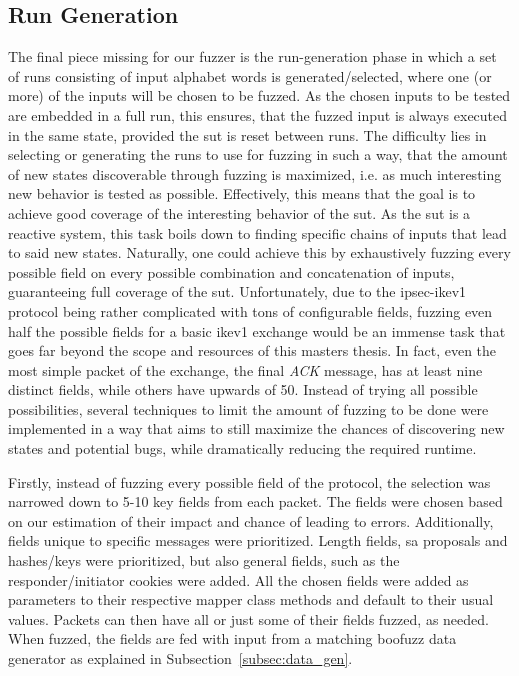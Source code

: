 \subsection{Run Generation} \label{subsec:run_generation}
The final piece missing for our fuzzer is the run-generation phase in which a set of runs consisting of input alphabet words is generated/selected, where one (or more) of the inputs will be chosen to be fuzzed. As the chosen inputs to be tested are embedded in a full run, this ensures, that the fuzzed input is always executed in the same state, provided the \ac{sut} is reset between runs. The difficulty lies in selecting or generating the runs to use for fuzzing in such a way, that the amount of new states discoverable through fuzzing is maximized, i.e. as much interesting new behavior is tested as possible. Effectively, this means that the goal is to achieve good coverage of the interesting behavior of the \ac{sut}. As the \ac{sut} is a reactive system, this task boils down to finding specific chains of inputs that lead to said new states. Naturally, one could achieve this by exhaustively fuzzing every possible field on every possible combination and concatenation of inputs, guaranteeing full coverage of the \ac{sut}. Unfortunately, due to the \ac{ipsec}-\ac{ike}v1 protocol being rather complicated with tons of configurable fields, fuzzing even half the possible fields for a basic \ac{ike}v1 exchange would be an immense task that goes far beyond the scope and resources of this masters thesis. In fact, even the most simple packet of the exchange, the final \emph{ACK} message, has at least nine distinct fields, while others have upwards of 50. Instead of trying all possible possibilities, several techniques to limit the amount of fuzzing to be done were implemented in a way that aims to still maximize the chances of discovering new states and potential bugs, while dramatically reducing the required runtime. 

Firstly, instead of fuzzing every possible field of the protocol, the selection was narrowed down to 5-10 key fields from each packet. The fields were chosen based on our estimation of their impact and chance of leading to errors. Additionally, fields unique to specific messages were prioritized. Length fields, \ac{sa} proposals and hashes/keys were prioritized, but also general fields, such as the responder/initiator cookies were added. All the chosen fields were added as parameters to their respective mapper class methods and default to their usual values. Packets can then have all or just some of their fields fuzzed, as needed. When fuzzed, the fields are fed with input from a matching boofuzz data generator as explained in Subsection~\ref{subsec:data_gen}.

